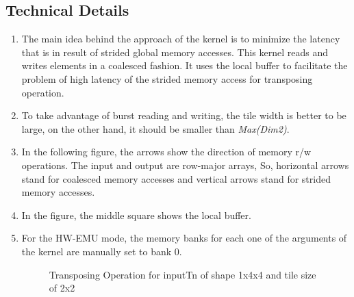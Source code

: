 \documentclass[•]{article}
\begin{document}
\subsection{Technical Details}
\begin{enumerate}
\item The main idea behind the approach of the kernel is to minimize the latency that is in result of strided global memory accesses. This kernel reads and writes elements in a coalesced fashion. It uses the local buffer to facilitate the problem of high latency of the strided memory access for transposing operation.

\item To take advantage of burst reading and writing, the tile width is better to be large, on the other hand, it should be smaller than \emph{Max(Dim2)}.

\item In the following figure, the arrows show the direction of memory r/w operations. The input and output are row-major arrays, So, horizontal arrows stand for coalesced memory accesses and vertical arrows stand for strided memory accesses.

\item In the figure, the middle square shows the local buffer.

\item For the HW-EMU mode, the memory banks for each one of the arguments of the kernel are manually set to bank 0.

\begin{figure}[h] 
\caption{Transposing Operation for inputTn of shape 1x4x4 and tile size of 2x2}
\label{fig:transpose01}
\centering
{}
\end{figure}

\end{enumerate}










\pagebreak
\end{document}
